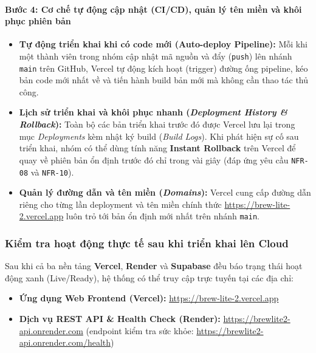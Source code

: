 \paragraph{Bước 4: Cơ chế tự động cập nhật (CI/CD), quản lý tên miền và khôi phục phiên bản}
\begin{itemize}
    \item \textbf{Tự động triển khai khi có code mới (Auto-deploy Pipeline):} Mỗi khi một thành viên trong nhóm cập nhật mã nguồn và đẩy (\texttt{push}) lên nhánh \texttt{main} trên GitHub, Vercel tự động kích hoạt (trigger) đường ống pipeline, kéo bản code mới nhất về và tiến hành build bản mới mà không cần thao tác thủ công.
    \item \textbf{Lịch sử triển khai và khôi phục nhanh (\textit{Deployment History \& Rollback}):} Toàn bộ các bản triển khai trước đó được Vercel lưu lại trong mục \textit{Deployments} kèm nhật ký build (\textit{Build Logs}). Khi phát hiện sự cố sau triển khai, nhóm có thể dùng tính năng \textbf{Instant Rollback} trên Vercel để quay về phiên bản ổn định trước đó chỉ trong vài giây (đáp ứng yêu cầu \texttt{NFR-08} và \texttt{NFR-10}).
    \item \textbf{Quản lý đường dẫn và tên miền (\textit{Domains}):} Vercel cung cấp đường dẫn riêng cho từng lần deployment và tên miền chính thức \url{https://brew-lite-2.vercel.app} luôn trỏ tới bản ổn định mới nhất trên nhánh \texttt{main}.
\end{itemize}

\subsubsection{Kiểm tra hoạt động thực tế sau khi triển khai lên Cloud}
Sau khi cả ba nền tảng \textbf{Vercel}, \textbf{Render} và \textbf{Supabase} đều báo trạng thái hoạt động xanh (Live/Ready), hệ thống có thể truy cập trực tuyến tại các địa chỉ:
\begin{itemize}
    \item \textbf{Ứng dụng Web Frontend (Vercel):} \url{https://brew-lite-2.vercel.app}
    \item \textbf{Dịch vụ REST API \& Health Check (Render):} \url{https://brewlite2-api.onrender.com} (endpoint kiểm tra sức khỏe: \url{https://brewlite2-api.onrender.com/health})
\end{itemize}

